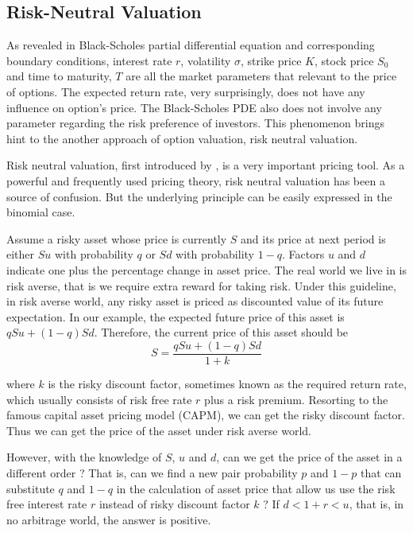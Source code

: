 \documentclass[12pt,oneside,titlepage]{book}
\begin{document}
\subsection{Risk-Neutral Valuation}
As revealed in Black-Scholes partial differential equation and corresponding boundary conditions, interest rate $r$, volatility $\sigma$, strike price $K$, stock price $S_0$ and time to maturity, $T$  are all the market parameters that relevant to the price of options. The expected return rate, very surprisingly, does not have any influence on option's price. The Black-Scholes PDE also does not involve any parameter regarding the risk preference of investors. This phenomenon brings hint to the another approach of option valuation, risk neutral valuation. 

Risk neutral valuation, first introduced by \citet*{cox-ross1976}, is a very important pricing tool. As a powerful and frequently used pricing theory, risk neutral valuation has been a source of confusion. But the underlying principle can be easily expressed in the binomial case. 

Assume a risky asset whose price is currently $S$ and its price at next period is either $Su$ with probability $q$ or $Sd$ with probability $1-q$. Factors $u$ and $d$ indicate one plus the percentage change in asset price. The real world we live in is risk averse, that is we require extra reward for taking risk. Under this guideline, in risk averse world, any risky asset is priced as discounted value of its future expectation. In our example, the expected future price of this asset is $qSu+(1-q)Sd$. Therefore, the current price of this asset should be 
\begin{equation}
S=\frac{qSu+(1-q)Sd}{1+k}
\end{equation}

where $k$ is the risky discount factor, sometimes known as the required return rate, which usually consists of risk free rate $r$ plus a risk premium. Resorting to the famous capital asset pricing model (CAPM), we can get the risky discount factor. Thus we can get the price of the asset under risk averse world. 

However, with the knowledge of $S$, $u$ and $d$, can we get the price of the asset in a different order ? That is, can we find a new pair probability $p$ and $1-p$ that can substitute $q$ and $1-q$ in the calculation of asset price that allow us use the risk free interest rate $r$ instead of risky discount factor $k$ ? If  $d < 1+r < u$, that is, in no arbitrage world, the answer is positive. 
\end{document}
